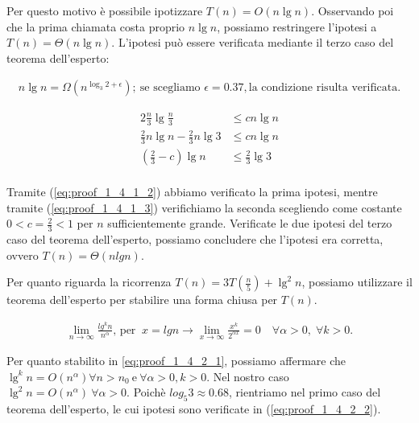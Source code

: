 \documentclass{article}
\begin{document}
\noindent Per questo motivo è possibile ipotizzare $T(n) = O(n\lg{n})$. Osservando poi che la prima chiamata costa proprio $n \lg{n}$, possiamo restringere l'ipotesi a $T(n) = \Theta(n \lg{n})$. L'ipotesi può essere verificata mediante il terzo caso del teorema dell'esperto:

\begin{equation} \label{eq:proof_1_4_1_2}
\begin{aligned}
n \lg{n} = \Omega(n^{\log_{3}{2} + \epsilon}); \ \text{se scegliamo } \epsilon = 0.37, \text{la condizione risulta verificata}.
\end{aligned}
\end{equation}

\begin{equation} \label{eq:proof_1_4_1_3}
\begin{aligned}
2 \frac{n}{3} \lg{\frac{n}{3}} &\le c n \lg{n} \\
\frac{2}{3} n \lg{n} - \frac{2}{3} n \lg{3} &\le c n \lg{n} \\
\left(\frac{2}{3} - c\right) \lg{n} &\le \frac{2}{3} \lg{3} \\
\end{aligned}
\end{equation}

\noindent  Tramite (\ref{eq:proof_1_4_1_2}) abbiamo verificato la prima ipotesi, mentre tramite (\ref{eq:proof_1_4_1_3}) verifichiamo la seconda scegliendo come costante $ 0 < c=\frac{2}{3} < 1$ per $n$ sufficientemente grande. Verificate le due ipotesi del terzo caso del teorema dell'esperto, possiamo concludere che l'ipotesi era corretta, ovvero $T(n) = \Theta(n lg{n})$.

\vspace{\baselineskip}

\noindent Per quanto riguarda la ricorrenza $T(n) = 3T(\frac{n}{5}) + \lg^2 n$, possiamo utilizzare il teorema dell'esperto per stabilire una forma chiusa per $T(n)$.


\begin{equation} \label{eq:proof_1_4_2_1}
\begin{aligned}
\lim_{n\to\infty} \frac{lg^k n}{n^\alpha} \text{, per } \ x = lg{n} \rightarrow \lim_{x\to\infty} \frac{x^k}{2^{\alpha x}} = 0 \quad \forall \alpha>0, \; \forall k>0.
\end{aligned}
\end{equation}

\noindent Per quanto stabilito in \ref{eq:proof_1_4_2_1}, possiamo affermare che $\lg^k n = O(n^\alpha)  \forall n>n_0 \ \text{e} \ \forall \alpha > 0, k>0$. Nel nostro caso $\lg^2 n = O(n^\alpha) \  \forall \alpha > 0$. Poichè $log_{5}{3} \approx 0.68 $, rientriamo nel primo caso del teorema dell'esperto, le cui ipotesi sono verificate in (\ref{eq:proof_1_4_2_2}).
\end{document}
